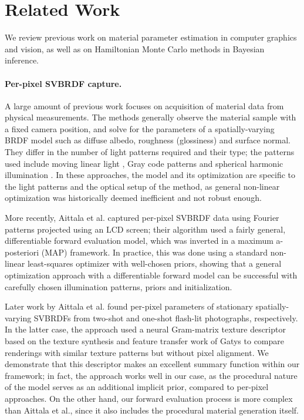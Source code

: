 \section{Related Work}
\label{sec:prior_work}
%
We review previous work on material parameter estimation in computer graphics and vision, as well as on Hamiltonian Monte Carlo methods in Bayesian inference.

\paragraph{Per-pixel SVBRDF capture.} A large amount of previous work focuses on acquisition of material data from physical measurements. The methods generally observe the material sample with a fixed camera position, and solve for the parameters of a spatially-varying BRDF model such as diffuse albedo, roughness (glossiness) and surface normal. They differ in the number of light patterns required and their type; the patterns used include moving linear light \cite{Gardner2003}, Gray code patterns \cite{Francken2009} and spherical harmonic illumination \cite{Ghosh2009}. In these approaches, the model and its optimization are specific to the light patterns and the optical setup of the method, as general non-linear optimization was historically deemed  inefficient and not robust enough.

More recently, Aittala et al. \cite{Aittala2013} captured per-pixel SVBRDF data using Fourier patterns projected using an LCD screen; their algorithm used a fairly general, differentiable forward evaluation model, which was inverted in a maximum a-posteriori (MAP) framework. In practice, this was done using a standard non-linear least-squares optimizer with well-chosen priors, showing that a general optimization approach with a differentiable forward model can be successful with carefully chosen illumination patterns, priors and initialization.

Later work by Aittala et al. \cite{Aittala2015,Aittala2016} found per-pixel parameters of stationary spatially-varying SVBRDFs from two-shot and one-shot flash-lit photographs, respectively. In the latter case, the approach used a neural Gram-matrix texture descriptor based on the texture synthesis and feature transfer work of Gatys \cite{Gatys2015,Gatys2016} to compare renderings with similar texture patterns but without pixel alignment. We demonstrate that this descriptor makes an excellent summary function within our framework; in fact, the approach works well in our case, as the procedural nature of the model serves as an additional implicit prior, compared to per-pixel approaches. On the other hand, our forward evaluation process is more complex than Aittala et al., since it also includes the procedural material generation itself.

